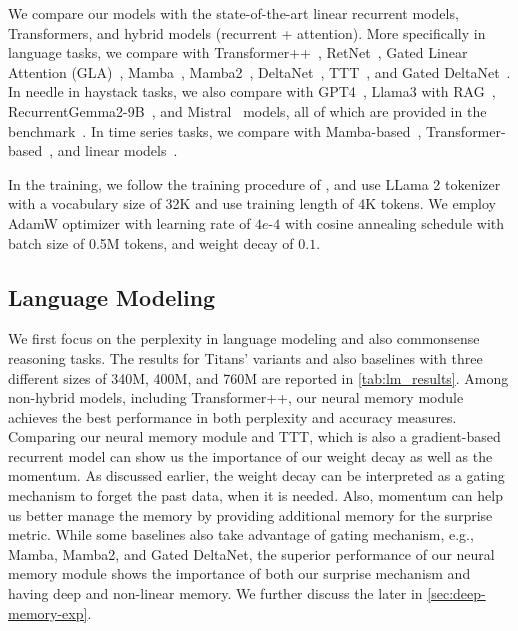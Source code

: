 \documentclass{article}
\newcommand{\citep}{\parencite}
\newcommand{\citet}{\textcite}
\newcommand{\head}[1]{\vspace{1.7mm}\noindent{{\textcolor{c3}{\bf #1.}}}}
\begin{document}
\head{Baselines}
We compare our models with the state-of-the-art linear recurrent models, Transformers, and hybrid models (recurrent + attention). More specifically in language tasks, we compare with Transformer++~\citep{touvron2023llama}, RetNet~\citep{sun2023retentive}, Gated Linear Attention (GLA)~\citep{yang2024gatedattn}, Mamba~\citep{gu2024mamba}, Mamba2~\citep{dao2024transformers}, DeltaNet~\citep{yang2024parallelizing}, TTT~\citep{sun2024learning}, and Gated DeltaNet~\citep{yang2024gated}. In needle in haystack tasks, we also compare with GPT4~\citep{achiam2023gpt}, Llama3 with RAG~\citep{touvron2023llama}, RecurrentGemma2-9B~\citep{botev2024recurrentgemma}, and Mistral~\citep{jiang2023mistral} models, all of which are provided in the benchmark~\citep{kuratov2024babilong}. In time series tasks, we compare with Mamba-based~\citep{behrouz2024mambamixer}, Transformer-based~\citep{nie2022time, liu2023itransformer, zhang2023crossformer}, and linear models~\citep{das2023longterm, wu2023timesnet, zeng2023transformers, li2023revisiting}. 

\head{Training}
In the training, we follow the training procedure of \citet{yang2024gated}, and use LLama 2 tokenizer with a vocabulary size of 32K and use training length of 4K tokens. We employ AdamW optimizer with learning rate of $4e$-$4$ with cosine annealing schedule with batch size of 0.5M tokens, and weight decay of $0.1$.   

\subsection{Language Modeling}\label{sec:exp-lm}
We first focus on the perplexity in language modeling and also commonsense reasoning tasks. The results for Titans' variants and also baselines with three different sizes of 340M, 400M, and 760M are reported in \autoref{tab:lm_results}. Among non-hybrid models, including Transformer++, our neural memory module achieves the best performance in both perplexity and accuracy measures. Comparing our neural memory module and TTT, which is also a gradient-based recurrent model can show us the importance of our weight decay as well as the momentum. As discussed earlier, the weight decay can be interpreted as a gating mechanism to forget the past data, when it is needed. Also, momentum can help us better manage the memory by providing additional memory for the surprise metric. While some baselines also take advantage of gating mechanism, e.g., Mamba, Mamba2, and Gated DeltaNet, the superior performance of our neural memory module shows the importance of both our surprise mechanism and having deep and non-linear memory. We further discuss the later in \autoref{sec:deep-memory-exp}. 
\end{document}
